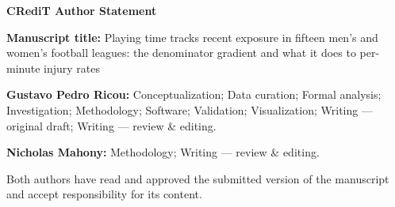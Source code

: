 \documentclass[11pt]{article}
\begin{document}
{\large\bfseries CRediT Author Statement\par}

\vspace{0.5em}

\textbf{Manuscript title:} Playing time tracks recent exposure in fifteen
men's and women's football leagues: the denominator gradient and what it
does to per-minute injury rates

\vspace{0.5em}

\textbf{Gustavo Pedro Ricou:} Conceptualization; Data curation; Formal
analysis; Investigation; Methodology; Software; Validation; Visualization;
Writing --- original draft; Writing --- review \& editing.

\textbf{Nicholas Mahony:} Methodology; Writing --- review \& editing.

\vspace{0.5em}

Both authors have read and approved the submitted version of the manuscript
and accept responsibility for its content.
\end{document}
